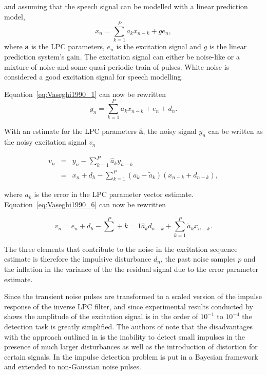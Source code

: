 and assuming that the speech signal can be modelled with a linear prediction model,
\begin{equation}\label{eq:Vaseghi1990_4}
x_n = \sum^P_{k=1} a_k x_{n-k} +ge_n,
\end{equation}
where $\mathbf{a}$ is the LPC parameters, $e_n$ is the excitation signal and $g$ is the linear prediction system's gain. The excitation signal can either be noise-like or a mixture of noise and some quasi periodic train of pulses. White noise is considered a good excitation signal for speech modelling\cite{Vaseghi1990}.

Equation~\ref{eq:Vaseghi1990_1} can now be rewritten
\begin{equation}\label{eq:Vaseghi1990_5}
y_n = \sum^P_{k=1} a_k x_{n-k} + e_n + d_n.
\end{equation}

With an estimate for the LPC parameters $\mathbf{\hat{a}}$, the noisy signal $y_n$ can be written as the noisy excitation signal $v_n$

\begin{eqnarray}
  v_n &=& y_n - \sum^P_{k=1} \hat{a}_k y_{n-k} \nonumber\\
  &=& x_n + d_h - \sum^P_{k=1} (a_k - \tilde{a}_k)(x_{n-k} + d_{n-k}),\label{eq:Vaseghi1990_6}
\end{eqnarray}

where $a_k$ is the error in the LPC parameter vector estimate. Equation~\ref{eq:Vaseghi1990_6} can now be rewritten

\begin{equation}\label{eq:Vaseghi1990_7}
v_n = e_n + d_h - \sum^P+{k=1} \hat{a}_k d_{n-k} + \sum^P_{k=1} \tilde{a}_k x_{n-k}.
\end{equation}

The three elements that contribute to the noise in the excitation sequence estimate is therefore the impulsive disturbance $d_n$, the past noise samples $p$ and the inflation in the variance of the the residual signal due to the error parameter estimate\cite{Vaseghi1990}.


Since the transient noise pulses are transformed to a scaled version of the impulse response of the inverse LPC filter, and since experimental results conducted by \cite{Vaseghi1990} shows the amplitude of the excitation signal is in the order of $10^{-1}$ to $10^{-4}$ the detection task is greatly simplified. The authors of \cite{Godsill1998} note that the disadvantages with the approach outlined in \cite{Vaseghi1990} is the inability to detect small impulses in the presence of much larger disturbances as well as the introduction of distortion for certain signals. In \cite{Godsill1998} the impulse detection problem is put in a Bayesian framework and extended to non-Gaussian noise pulses.

